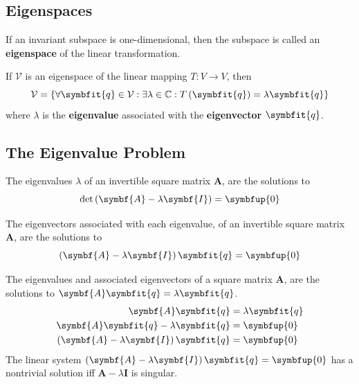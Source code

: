 \documentclass{article}
\begin{document}
\subsection{Eigenspaces}
\begin{definition}
    If an invariant subspace is one-dimensional, then the subspace is
    called an \textbf{eigenspace} of the linear transformation.
\end{definition}
\begin{theorem}
    If \(\mathcal{V}\) is an eigenspace of the linear mapping
    \(T: V \rightarrow V\), then
    \begin{equation*}
        \mathcal{V} = \left\{ \forall \symbfit{q}\in \mathcal{V}:\exists \lambda \in \mathbb{C}:T\left(\symbfit{q}\right)=\lambda \symbfit{q} \right\}
    \end{equation*}
    where \(\lambda\) is the \textbf{eigenvalue} associated with the
    \textbf{eigenvector} \(\symbfit{q}\).
\end{theorem}
\subsection{The Eigenvalue Problem}
\begin{theorem}
    The eigenvalues \(\lambda\) of an invertible square matrix
    \(\symbf{A}\), are the solutions to
    \begin{equation*}
        \det{\left( \symbf{A} - \lambda \symbf{I} \right)}=\symbfup{0}
    \end{equation*}
\end{theorem}
\begin{theorem}
    The eigenvectors associated with each eigenvalue, of an invertible
    square matrix \(\symbf{A}\), are the solutions to
    \begin{equation*}
        \left( \symbf{A} - \lambda \symbf{I} \right) \symbfit{q}=\symbfup{0}
    \end{equation*}
\end{theorem}
\begin{solution}[Proof]
    The eigenvalues and associated eigenvectors of a square matrix
    \(\symbf{A}\), are the solutions to
    \(\symbf{A}\symbfit{q}=\lambda \symbfit{q}\).
    \begin{align*}
        \symbf{A}\symbfit{q}                                     & =\lambda \symbfit{q} \\
        \symbf{A}\symbfit{q} - \lambda \symbfit{q}               & =\symbfup{0}         \\
        \left( \symbf{A} - \lambda \symbf{I} \right) \symbfit{q} & =\symbfup{0}
    \end{align*}
    The linear system
    \(\left( \symbf{A} - \lambda\symbf{I} \right) \symbfit{q}=\symbfup{0}\)
    has a nontrivial solution iff \(\symbf{A} - \lambda \symbf{I}\)
    is singular.
\end{solution}
\end{document}

